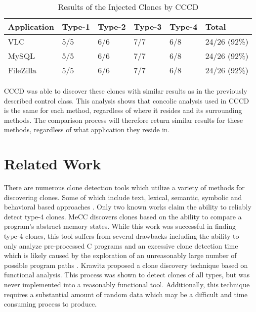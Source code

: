 \documentclass[conference]{IEEEtran}
\begin{document}
\begin{table}[thb!]

\begin{center}
    \begin{tabular}{ l | l | l | l | l | l }
    \toprule
    Application & Type-1 & Type-2 & Type-3 & Type-4 & Total \\ \hline
    VLC  & 5/5  &6/6   & 7/7  & 6/8  & 24/26 (92\%)\\ \hline
MySQL & 5/5  &6/6   & 7/7  & 6/8  & 24/26 (92\%)\\ \hline
FileZilla & 5/5  &6/6   & 7/7  & 6/8  & 24/26 (92\%)\\ \bottomrule

    \end{tabular}
\end{center}
\caption{Results of the Injected Clones by CCCD}
\label{table:injectedclones}
\vspace{-0.3in}
\end{table}




CCCD was able to discover these clones with similar results as in the previously described control class. This analysis shows that concolic analysis used in CCCD is the same for each method, regardless of where it resides and its surrounding methods. The comparison process will therefore return similar results for these methods, regardless of what application they reside in. 



\section{Related Work}
\label{sec: relatedwork}

There are numerous clone detection tools which utilize a variety of methods for discovering clones. Some of which include text, lexical, semantic, symbolic and behavioral based approaches \cite{Roy:2009:CEC:1530898.1531101}. Only two known works claim the ability to reliably detect type-4 clones. MeCC discovers clones based on the ability to compare a program's abstract memory states. While this work was successful in finding type-4 clones, this tool suffers from several drawbacks including the ability to only analyze pre-processed C programs and an excessive clone detection time which is likely caused by the exploration of an unreasonably large number of possible program paths \cite{Kim:2011:MMC:1985793.1985835}.  Krawitz \cite{Kraw2012} proposed a clone discovery technique based on functional analysis. This process was shown to detect clones of all types, but was never implemented into a reasonably functional tool. Additionally, this technique requires a substantial amount of random data which may be a difficult and time consuming process to produce.
\end{document}
